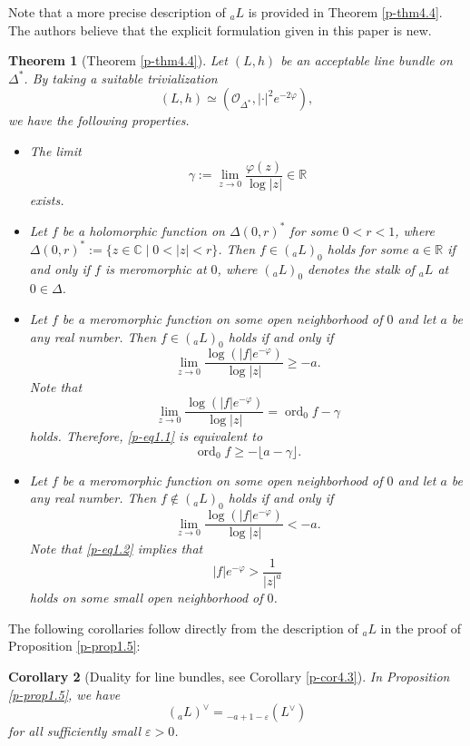 \documentclass[12pt,twoside]{amsart}
\DeclareMathOperator{\ord}{ord}
\newtheorem{thm}{Theorem}[section]
\newtheorem{cor}[thm]{Corollary}
\theoremstyle{definition}
\begin{document}
Note that a more precise description of ${}_a L$ is provided in Theorem \ref{p-thm4.4}.  
The authors believe that the explicit formulation given in this paper is new. 

\begin{thm}[Theorem \ref{p-thm4.4}]\label{p-thm1.6}
Let $(L, h)$ be an acceptable line bundle on $\Delta^*$. 
By taking a suitable trivialization 
\[
(L, h)\simeq \left(\mathcal O_{\Delta^*}, |\cdot|^2e^{-2\varphi}\right), 
\] 
we have the following properties. 
\begin{itemize}
\item[(i)] The limit 
\[
\gamma :=\lim_{z\to 0} \frac{\varphi(z)}{\log |z|}\in \mathbb R
\] 
exists. 
\item[(ii)] Let $f$ be a holomorphic function on $\Delta(0, r)^*$ for some $0<r<1$, 
where $\Delta(0, r)^*:=\{z\in \mathbb C\mid 0<|z|<r\}$. 
Then $f\in ({}_a L)_0$ holds for some $a\in \mathbb R$ if and only if 
$f$ is meromorphic at $0$, where $({}_a L)_0$ 
denotes the stalk of ${}_a L$ at $0 \in \Delta$. 
\item[(iii)] Let $f$ be a meromorphic function on some open neighborhood 
of $0$ and let $a$ be any real number. 
Then $f\in ({}_a L)_0$ holds if and only if 
\begin{equation}\label{p-eq1.1} 
\lim _{z\to 0} \frac{\log \left(|f|e^{-\varphi}\right)}{\log |z|} \geq -a. 
\end{equation} 
Note that 
\[
\lim _{z\to 0} \frac{\log \left(|f|e^{-\varphi}\right)}{\log |z|}=\ord _0 f-\gamma 
\] holds. 
Therefore, \eqref{p-eq1.1} is equivalent to 
\[
\ord _0 f\geq -\lfloor a -\gamma\rfloor. 
\]
\item[(iv)] Let $f$ be a meromorphic function on some open 
neighborhood of $0$ and let $a$ be any real number. 
Then $f\not\in ({}_a L)_0$ holds if and only if 
\begin{equation}\label{p-eq1.2}
\lim _{z\to 0} \frac{\log \left(|f|e^{-\varphi}\right)}{\log |z|}<-a. 
\end{equation} 
Note that \eqref{p-eq1.2} implies that 
\[
|f|e^{-\varphi} >\frac{1}{|z|^a}
\] 
holds on some small open neighborhood of $0$. 
\end{itemize}
\end{thm}  

The following corollaries 
follow directly from the description of ${}_a L$ in the proof of Proposition \ref{p-prop1.5}:

\begin{cor}[Duality for line bundles, see Corollary \ref{p-cor4.3}]\label{p-cor1.7}
In Proposition \ref{p-prop1.5}, we have
\[
({}_a L)^\vee = {}_{-a + 1 - \varepsilon}(L^\vee)
\]
for all sufficiently small $\varepsilon > 0$.
\end{cor}
\end{document}
